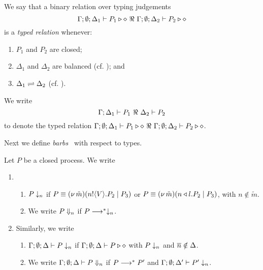 \begin{definition}
	We say that a binary relation over typing judgements
	\[
		\Gamma; \emptyset; \Delta_1 \vdash P_1 \triangleright \diamond\ \Re \ \Gamma; \emptyset; \Delta_2 \vdash P_2 \triangleright \diamond
	\]
%
	\noi
	is a {\em typed relation} whenever:
	\begin{enumerate}
		\item	$P_1$ and $P_2$ are closed;
		\item	$\Delta_1$ and $\Delta_2$ are balanced (cf. ); and
		\item	$\Delta_1 \rightleftharpoons \Delta_2$ (cf. ).
	\end{enumerate}
	\end{definition}
\begin{notation}
	We write
	\[
		\horel{\Gamma}{\Delta_1}{P_1}{\ \Re \ }{\Delta_2}{P_2}
	\]
	to denote the typed relation 
		$\Gamma; \emptyset; \Delta_1 \vdash P_1 \triangleright \diamond\ \Re \ \Gamma; \emptyset; \Delta_2 \vdash P_2 \triangleright \diamond$.
\end{notation}	


Next we define  {\em barbs}~\cite{MiSa92}
with respect to types. 

\begin{definition}[Barbs]
	\label{def:barbs}
	Let $P$ be a closed process. We write
	\begin{enumerate}
		\item
				\begin{enumerate}
					\item	$P \downarrow_{n}$ if $P \equiv (\nu\, \tilde{m})(n ! \langle V \rangle . P_2 \;|\; P_3)$
					or %
					$P \equiv (\nu\, \tilde{m})(n \triangleleft l . P_2 \;|\; P_3)$, with $n \notin \tilde{m}$.
					\item	We write $P \Downarrow_{n}$ if $P \longrightarrow^* \downarrow_{n}$.
				\end{enumerate}

		\item	Similarly, we write
				\begin{enumerate}
					\item	$\Gamma; \emptyset; \Delta \vdash P \downarrow_{n}$ if
							$\Gamma; \emptyset; \Delta \vdash P \triangleright \diamond$ with $P \downarrow_{n}$ and $\overline{n} \notin \Delta$.
					\item	We write $\Gamma; \emptyset; \Delta \vdash P \Downarrow_{n}$ if $P \longrightarrow^* P'$ and
							$\Gamma; \emptyset; \Delta' \vdash P' \downarrow_{n}$.
				\end{enumerate}
	\end{enumerate}
\end{definition}

